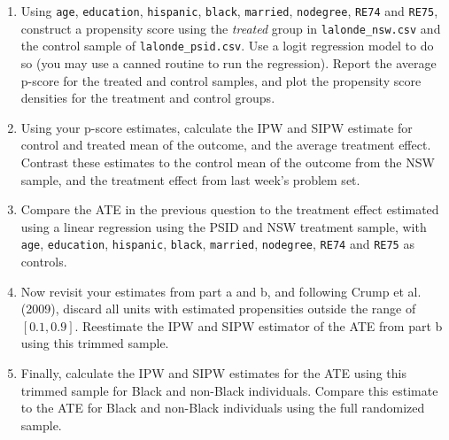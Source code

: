\documentclass[11pt, a4paper]{article}
\begin{document}
\begin{enumerate}
\begin{enumerate}
  \item Using \texttt{age}, \texttt{education}, \texttt{hispanic},
    \texttt{black}, \texttt{married}, \texttt{nodegree}, \texttt{RE74}
    and \texttt{RE75}, construct a propensity score using the
    \emph{treated} group in \texttt{lalonde\_nsw.csv} and the control
    sample of \texttt{lalonde\_psid.csv}.  Use a logit regression
    model to do so (you may use a canned routine to run the
    regression). Report the average p-score for the treated and
    control samples, and plot the propensity score densities for the
    treatment and control groups.
  \item Using your p-score estimates, calculate the IPW and SIPW
    estimate for control and treated mean of the outcome, and the
    average treatment effect. Contrast these estimates to the control
    mean of the outcome from the NSW sample, and the treatment effect
    from last week's problem set.
  \item Compare the ATE in the previous question to the treatment
    effect estimated using a linear regression using the PSID and NSW
    treatment sample, with \texttt{age}, \texttt{education},
    \texttt{hispanic}, \texttt{black}, \texttt{married},
    \texttt{nodegree}, \texttt{RE74} and \texttt{RE75} as controls.
  \item Now revisit your estimates from part a and b, and following
    Crump et al. (2009), discard all units with estimated propensities
    outside the range of $[0.1, 0.9]$. Reestimate the IPW and SIPW
    estimator of the ATE from part b using this trimmed sample.
  \item Finally, calculate the IPW and SIPW estimates for the ATE
    using this trimmed sample for Black and non-Black
    individuals. Compare this estimate to the ATE for Black and
    non-Black individuals using the full randomized sample.
  \end{enumerate}
  
\end{enumerate}
\end{document}
